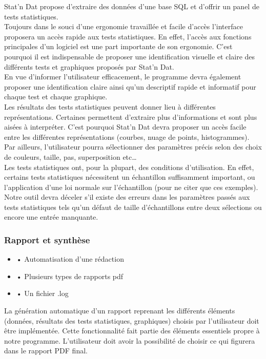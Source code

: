 \documentclass[a4paper,10pt]{report}
\begin{document}
Stat’n Dat propose d’extraire des données d’une base SQL et d’offrir un panel de tests statistiques. \\
Toujours dans le souci d’une ergonomie travaillée et facile d’accès l’interface proposera un accès rapide aux tests statistiques. En effet, l’accès aux fonctions principales d’un logiciel est une part importante de son ergonomie. C’est pourquoi il est indispensable de proposer une identification visuelle et claire des différents tests et graphiques proposés par Stat’n Dat.\\

En vue d’informer l’utilisateur efficacement, le programme devra également proposer une identification claire ainsi qu’un descriptif rapide et informatif pour chaque test et chaque graphique.\\

Les résultats des tests statistiques peuvent donner lieu à différentes représentations. Certaines permettent d’extraire plus d’informations et sont plus aisées à interpréter. C’est pourquoi Stat’n Dat devra proposer un accès facile entre les différentes représentations (courbes, nuage de points, histogrammes). Par ailleurs, l’utilisateur pourra sélectionner des paramètres précis selon des choix de couleurs, taille, pas, superposition etc… \\

Les tests statistiques ont, pour la plupart, des conditions d’utilisation. En effet, certains tests statistiques nécessitent un échantillon suffisamment important, ou l’application d’une loi normale sur l’échantillon (pour ne citer que ces exemples). Notre outil devra déceler s’il existe des erreurs dans les paramètres passés aux tests statistiques tels qu’un défaut de taille d’échantillons entre deux sélections ou encore une entrée manquante.

\subsubsection{Rapport et synthèse}

\begin{itemize}

\item 	•	Automatisation d’une rédaction
\item 	•	Plusieurs types de rapports pdf
\item 	•	Un fichier .log

\end{itemize} 

La génération automatique d'un rapport reprenant les différents éléments (données, résultats des tests statistiques, graphiques) choisis par l'utilisateur doit être implémentée. Cette fonctionnalité fait partie des éléments essentiels propre à notre programme. L'utilisateur doit avoir la possibilité de choisir ce qui figurera dans le rapport PDF final.\\
\end{document}
